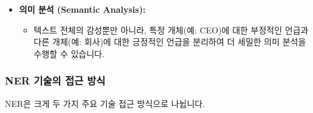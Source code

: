 \documentclass[11pt,a4paper]{article}
\theoremstyle{definition}
\begin{document}
\begin{itemize}
\begin{itemize}
        \end{itemize}
    \item \textbf{의미 분석 (Semantic Analysis):}
        \begin{itemize}
            \item 텍스트 전체의 감성뿐만 아니라, 특정 개체(예: CEO)에 대한 부정적인 언급과 다른 개체(예: 회사)에 대한 긍정적인 언급을 분리하여 더 세밀한 의미 분석을 수행할 수 있습니다.
        \end{itemize}
\end{itemize}

\subsubsection*{NER 기술의 접근 방식}
NER은 크게 두 가지 주요 기술 접근 방식으로 나뉩니다.
\end{document}

